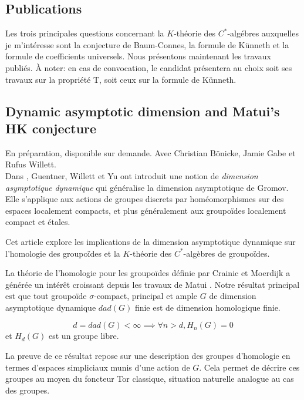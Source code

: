 \documentclass[a4paper,11pt]{article}
\begin{document}
\subsection*{Publications}

Les trois principales questions concernant la $K$-th\'eorie des $C^*$-alg\'ebres auxquelles je m'int\'eresse sont la conjecture de Baum-Connes, la formule de K\"unneth et la formule de coefficients universels. Nous pr\'esentons maintenant les travaux publi\'es. \`A noter: en cas de convocation, le candidat pr\'esentera au choix soit ses travaux sur la propri\'et\'e T, soit ceux sur la formule de K\"unneth.

\subsection{Dynamic asymptotic dimension and Matui's HK conjecture}

En préparation, disponible sur demande. Avec Christian B\"onicke, Jamie Gabe et Rufus Willett.\\

Dans \cite{Guentner:2014aa}, Guentner, Willett et Yu ont introduit une notion de \textit{dimension asymptotique dynamique} qui généralise la dimension asymptotique de Gromov. Elle s'applique aux actions de groupes discrets par homéomorphismes sur des espaces localement compacts, et plus généralement aux groupoïdes localement compact et étales. 

Cet article explore les implications de la dimension asymptotique dynamique sur l'homologie des groupoïdes et la $K$-théorie des $C^*$-algèbres de groupoïdes. 

La théorie de l'homologie pour les groupoïdes définie par Crainic et Moerdijk \cite{Crainic2000} a générée un intérêt croissant depuis les travaux de Matui \cite{Matui2012}. Notre résultat principal est que tout groupoïde $\sigma$-compact, principal et ample $G$ de dimension asymptotique dynamique $dad(G)$ finie est de dimension homologique finie.
\begin{thmx}
$$ d=dad(G)<\infty \implies \forall n>d, H_n(G)=0$$
et $H_d(G)$ est un groupe libre.
\end{thmx}

La preuve de ce résultat repose sur une description des groupes d'homologie en termes d'espaces simpliciaux munis d'une action de $G$. Cela permet de décrire ces groupes au moyen du foncteur Tor classique, situation naturelle analogue au cas des groupes. 
\end{document}
